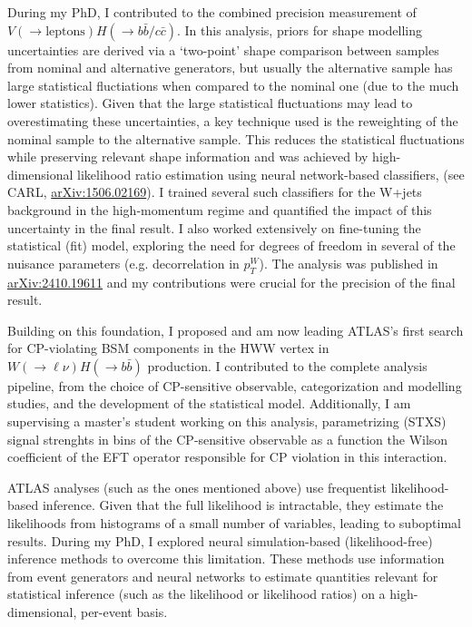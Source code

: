 \documentclass[11pt, a4paper]{awesome-cv}
\begin{document}
\begin{cvletter}
During my PhD, I contributed to the combined precision measurement of $V(\to \textrm{leptons})H(\to b\bar{b}/c\bar{c})$. In this analysis, priors for shape modelling uncertainties are derived via a `two-point' shape comparison between samples from nominal and alternative generators, but usually the alternative sample has large statistical fluctiations when compared to the nominal one (due to the much lower statistics). Given that the large statistical fluctuations may lead to overestimating these uncertainties, a key technique used is the reweighting of the nominal sample to the alternative sample. This reduces the statistical fluctuations while preserving relevant shape information and was achieved by high-dimensional likelihood ratio estimation using neural network-based classifiers, (see CARL, \href{https://arxiv.org/abs/1506.02169}{arXiv:1506.02169}). I trained several such classifiers for the W+jets background in the high-momentum regime and quantified the impact of this uncertainty in the final result. I also worked extensively on fine-tuning the statistical (fit) model, exploring the need for degrees of freedom in several of the nuisance parameters (e.g. decorrelation in $p_T^W$). The analysis was published in \href{https://arxiv.org/abs/2410.19611}{arXiv:2410.19611} and my contributions were crucial for the precision of the final result.

Building on this foundation, I proposed and am now leading ATLAS's first search for CP-violating BSM components in the HWW vertex in $W(\to \ell \nu)H(\to b\bar{b})$ production. I contributed to the complete analysis pipeline, from the choice of CP-sensitive observable, categorization and modelling studies, and the development of the statistical model. Additionally, I am supervising a master's student working on this analysis, parametrizing (STXS) signal strenghts in bins of the CP-sensitive observable as a function the Wilson coefficient of the EFT operator responsible for CP violation in this interaction.


ATLAS analyses (such as the ones mentioned above) use frequentist likelihood-based inference. Given that the full likelihood is intractable, they estimate the likelihoods from histograms of a small number of variables, leading to suboptimal results. During my PhD, I explored neural simulation-based (likelihood-free) inference methods to overcome this limitation. These methods use information from event generators and neural networks to estimate quantities relevant for statistical inference (such as the likelihood or likelihood ratios) on a high-dimensional, per-event basis.


\end{cvletter}
\end{document}

